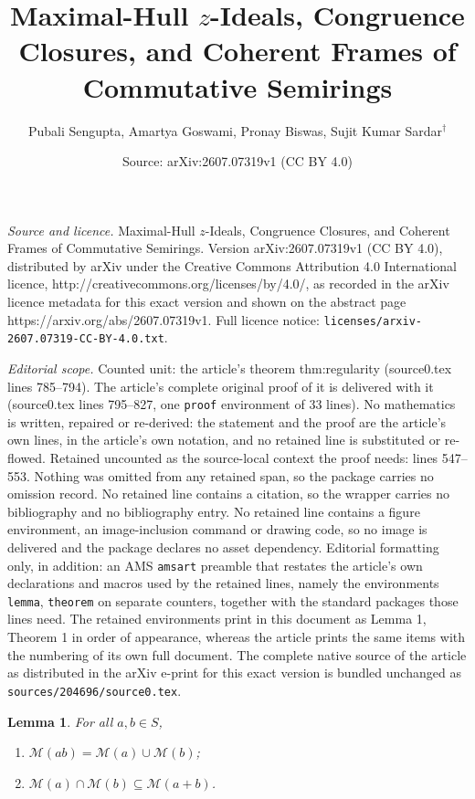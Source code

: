 \documentclass[10pt,a4paper]{amsart}
\title{Maximal-Hull $z$-Ideals, Congruence Closures, and Coherent Frames of Commutative Semirings}
\author{Pubali Sengupta, Amartya Goswami, Pronay Biswas, Sujit Kumar Sardar$^\dagger$}
\date{Source: arXiv:2607.07319v1 (CC BY 4.0)}
\newtheorem{lemma}{Lemma}
\newcommand{\M}{\mathcal M}
\begin{document}
\maketitle

\noindent\emph{Source and licence.} Maximal-Hull $z$-Ideals, Congruence Closures, and Coherent Frames of Commutative Semirings. Version arXiv:2607.07319v1 (CC BY 4.0), distributed by arXiv under the Creative Commons Attribution 4.0 International licence, http://creativecommons.org/licenses/by/4.0/, as recorded in the arXiv licence metadata for this exact version and shown on the abstract page https://arxiv.org/abs/2607.07319v1. Full licence notice: \texttt{licenses/arxiv-2607.07319-CC-BY-4.0.txt}.\par\smallskip

\noindent\textit{Editorial scope.} Counted unit: the article's theorem thm:regularity (source0.tex lines 785--794). The article's complete original proof of it is delivered with it (source0.tex lines 795--827, one \texttt{proof} environment of 33 lines). No mathematics is written, repaired or re-derived: the statement and the proof are the article's own lines, in the article's own notation, and no retained line is substituted or re-flowed.  Retained uncounted as the source-local context the proof needs: lines 547--553.  Nothing was omitted from any retained span, so the package carries no omission record.  No retained line contains a citation, so the wrapper carries no bibliography and no bibliography entry.  No retained line contains a figure environment, an image-inclusion command or drawing code, so no image is delivered and the package declares no asset dependency.  Editorial formatting only, in addition: an AMS \texttt{amsart} preamble that restates the article's own declarations and macros used by the retained lines, namely the environments \texttt{lemma}, \texttt{theorem} on separate counters, together with the standard packages those lines need.  The retained environments print in this document as Lemma 1, Theorem 1 in order of appearance, whereas the article prints the same items with the numbering of its own full document.  The complete native source of the article as distributed in the arXiv e-print for this exact version is bundled unchanged as \texttt{sources/204696/source0.tex}.
\begin{lemma}\label{loc6}
For all $a,b\in S$,
\begin{enumerate}
\item $\M(ab)=\M(a)\cup\M(b)$;
\item $\M(a)\cap\M(b)\subseteq\M(a+b)$.
\end{enumerate}
\end{lemma}
\end{document}
